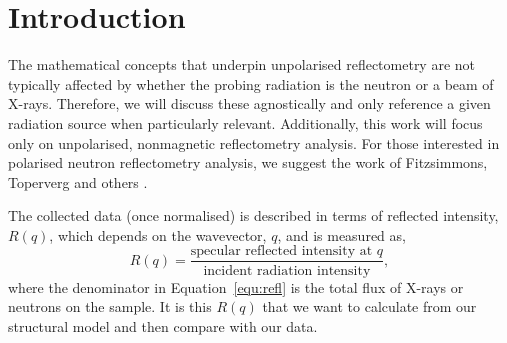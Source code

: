 \documentclass[
 reprint,
 superscriptaddress,
 amsmath,amssymb,
 aps,
]{revtex4-1}
\begin{document}
\maketitle


\section{Introduction}
The mathematical concepts that underpin unpolarised reflectometry are not typically affected by whether the probing radiation is the neutron or a beam of X-rays.
Therefore, we will discuss these agnostically and only reference a given radiation source when particularly relevant.
Additionally, this work will focus only on unpolarised, nonmagnetic reflectometry analysis.
For those interested in polarised neutron reflectometry analysis, we suggest the work of Fitzsimmons, Toperverg and others \cite{fitzsimmons_applications_2005,zabel_polarized_2007,toperberg_neutron_2015}.

The collected data (once normalised) is described in terms of reflected intensity, $R(q)$, which depends on the wavevector, $q$, and is measured as,
%
\begin{equation}
    R(q) = \frac{\text{specular reflected intensity at $q$}}{\text{incident radiation intensity}},
    \label{equ:refl}
\end{equation}
%
where the denominator in Equation~\ref{equ:refl} is the total flux of X-rays or neutrons on the sample.
It is this $R(q)$ that we want to calculate from our structural model and then compare with our data.
\end{document}
